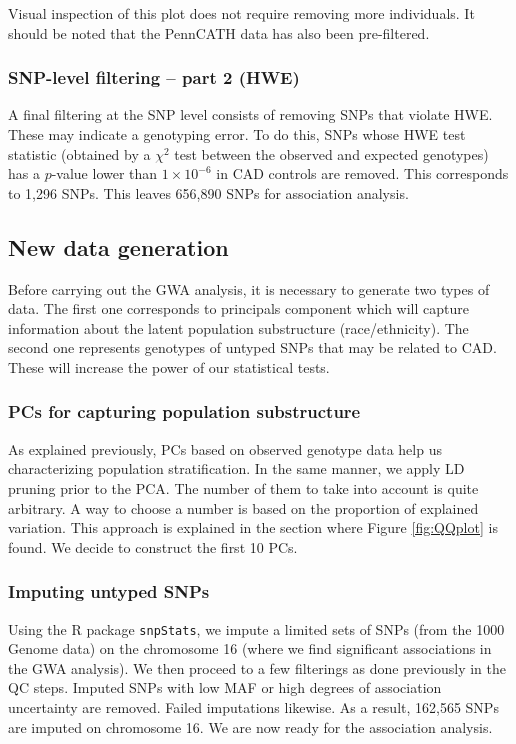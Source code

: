 \documentclass[a4paper, 12pt]{article}
\begin{document}
Visual inspection of this plot does not require removing more individuals. It should be noted that the PennCATH data has also been pre-filtered. 

\subsubsection*{SNP-level filtering -- part 2 (HWE)}

A final filtering at the SNP level consists of removing SNPs that violate HWE. These may indicate a genotyping error. To do this, SNPs whose HWE test statistic (obtained by a $\chi^2$ test between the observed and expected genotypes) has a $p$-value lower than $1 \times 10^{-6}$ in CAD controls are removed. This corresponds to 1,296 SNPs. This leaves 656,890 SNPs for association analysis. 

\subsection{New data generation}

Before carrying out the GWA analysis, it is necessary to generate two types of data. The first one corresponds to principals component which will capture information about the latent population substructure (race/ethnicity). The second one represents genotypes of untyped SNPs that may be related to CAD. These will increase the power of our statistical tests. 

\subsubsection*{PCs for capturing population substructure}

As explained previously, PCs based on observed genotype data help us characterizing population stratification. In the same manner, we apply LD pruning prior to the PCA. The number of them to take into account is quite arbitrary. A way to choose a number is based on the proportion of explained variation. This approach is explained in the section where Figure \ref{fig:QQplot} is found. We decide to construct the first 10 PCs. 

\subsubsection*{Imputing untyped SNPs}

Using the R package \texttt{snpStats}, we impute a limited sets of SNPs (from the 1000 Genome data) on the chromosome 16 (where we find significant associations in the GWA analysis). We then proceed to a few filterings as done previously in the QC steps. Imputed SNPs with low MAF or high degrees of association uncertainty are removed. Failed imputations likewise. As a result, 162,565 SNPs are imputed on chromosome 16. We are now ready for the association analysis.  
\end{document}
